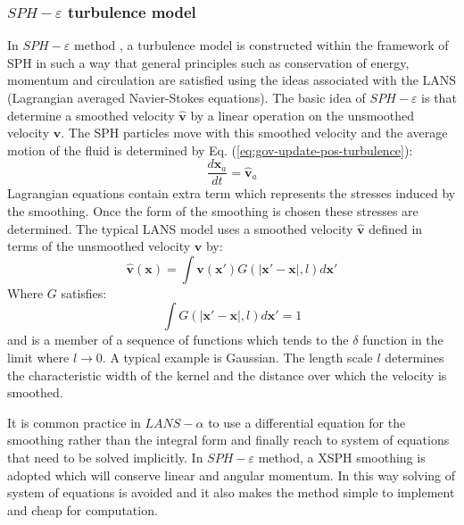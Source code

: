 \documentclass[journal abbreviation, manuscript]{copernicus}
\begin{document}
\subsubsection{$SPH-\varepsilon$ turbulence model}
In $SPH-\varepsilon$ method \citep{monaghan2011turbulence}, a turbulence model is constructed within the framework of SPH in such a way that general principles such as conservation of energy, momentum and circulation are satisfied using the ideas associated with the LANS (Lagrangian averaged Navier-Stokes equations). The basic idea of $SPH-\varepsilon$ is that determine a smoothed velocity $\widehat{\textbf{v}}$ by a linear operation on the unsmoothed velocity $\textbf{v}$. The SPH particles move with this smoothed velocity and the average motion of the fluid is determined by Eq. (\ref{eq:gov-update-pos-turbulence}):
\begin{equation}
\dfrac{d \textbf{x}_a}{dt} = \widehat{\textbf{v}}_a \label{eq:gov-update-pos-turbulence}
\end{equation}
Lagrangian equations contain extra term which represents the stresses induced by the smoothing. Once the form of the smoothing is chosen these stresses are determined. 
The typical LANS model uses a smoothed velocity $\widehat{\textbf{v}}$ 
defined in terms of the unsmoothed velocity $\textbf{v}$ by:
\begin{equation}
\widehat{\textbf{v}}(\textbf{x})=\int \textbf{v}(\textbf{x} \prime)G(\vert \textbf{x} \prime - \textbf{x} \vert, l) d\textbf{x} \prime
\end{equation}
Where $G$ satisfies:
\begin{equation}
\int G(\vert \textbf{x} \prime - \textbf{x} \vert, l) d\textbf{x} \prime =1
\end{equation}
and is a member of a sequence of functions which tends to the $\delta$ function in the limit where $ l\rightarrow 0$. A typical example is Gaussian.
The length scale $l$ determines the characteristic width of the kernel and the distance over which the velocity is smoothed.

It is common practice in $LANS-\alpha$ to use a differential equation for the smoothing rather than the integral form and finally reach to system of equations that need to be solved implicitly. In $SPH-\varepsilon$ method, a XSPH smoothing is adopted which will conserve linear and angular momentum. In this way solving of system of equations is avoided and it also makes the method simple to implement and cheap for computation. 
\end{document}
